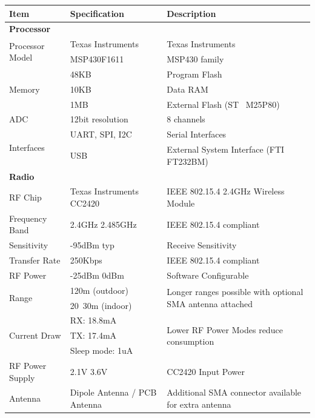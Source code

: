 \begin{table}[H]
	\centering
	\begin{tabularx}{\linewidth}{| l | l | X |}
	\hline
	\textbf{Item} & \textbf{Specification} & \textbf{Description} \\
	\hline
	\hline

	\multicolumn{3}{|l|}{\textbf{Processor}} \\
	\hline
	\multirow{2}{*}{Processor Model} & Texas Instruments\textregistered & Texas Instruments\textregistered\\
	~ & MSP430F1611 & MSP430 family\\
	\hline
	\multirow{3}{*}{Memory} & 48KB & Program Flash \\
	~ & 10KB & Data RAM \\
	~ & 1MB & External Flash (ST\textregistered~ M25P80) \\
	\hline
	ADC & 12bit resolution & 8 channels \\
	\hline
	\multirow{2}{*}{Interfaces} & UART, SPI, I2C & Serial Interfaces \\
	~ & USB & External System Interface (FTI\textregistered~ FT232BM) \\
	\hline
	\hline

	\multicolumn{3}{|l|}{\textbf{Radio}} \\
	\hline
	RF Chip & Texas Instruments\textregistered~ CC2420 & IEEE 802.15.4 2.4GHz Wireless Module\\
	\hline
	Frequency Band & 2.4GHz \mytilde 2.485GHz & IEEE 802.15.4 compliant \\
	\hline
	Sensitivity & -95dBm typ & Receive Sensitivity \\
	\hline
	Transfer Rate & 250Kbps & IEEE 802.15.4 compliant \\
	\hline
	RF Power & -25dBm \mytilde 0dBm & Software Configurable \\
	\hline
	\multirow{2}{*}{Range} & \mytilde120m (outdoor) & \multirow{2}{5cm}{Longer ranges possible with optional SMA antenna attached} \\
	~ & 20~\mytilde30m (indoor) & ~ \\
	\hline
	\multirow{3}{*}{Current Draw} & RX: 18.8mA & \multirow{3}{5.5cm}{Lower RF Power Modes reduce consumption} \\
	~ & TX: 17.4mA & ~ \\
	~ & Sleep mode: 1uA & ~ \\
	\hline
	RF Power Supply & 2.1V \mytilde 3.6V & CC2420 Input Power \\
	\hline
	Antenna & Dipole Antenna / PCB Antenna & Additional SMA connector available for extra antenna \\
	\hline
	\hline


\end{tabularx}
\end{table}
